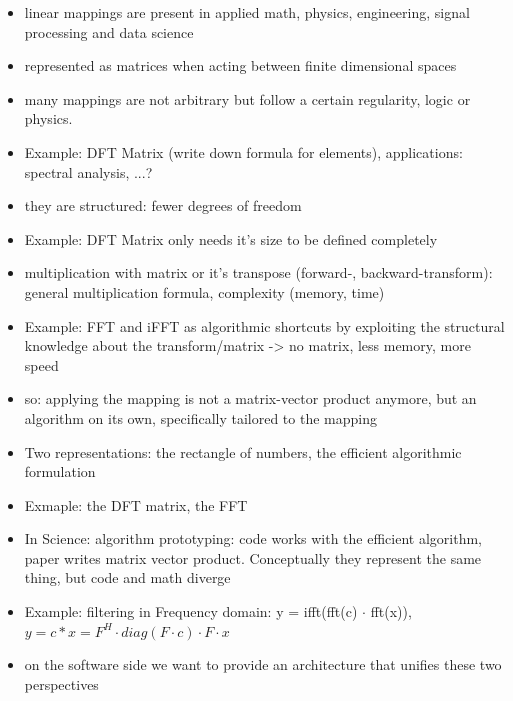 
%
%
%
%

\begin{itemize}
\item linear mappings are present in applied math, physics, engineering, signal processing and data science
\item represented as matrices when acting between finite dimensional spaces
\item many mappings are not arbitrary but follow a certain regularity, logic or physics.
\item Example: DFT Matrix (write down formula for elements), applications: spectral analysis, ...?
\item they are structured: fewer degrees of freedom
\item Example: DFT Matrix only needs it's size to be defined completely
\item multiplication with matrix or it's transpose (forward-, backward-transform): general multiplication formula, complexity (memory, time)
\item Example: FFT and iFFT as algorithmic shortcuts by exploiting the structural knowledge about the transform/matrix -> no matrix, less memory, more speed
\item so: applying the mapping is not a matrix-vector product anymore, but an algorithm on its own, specifically tailored to the mapping
\item Two representations: the rectangle of numbers, the efficient algorithmic formulation
\item Exmaple: the DFT matrix, the FFT
\item In Science: algorithm prototyping: code works with the efficient algorithm, paper writes matrix vector product. Conceptually they represent the same thing, but code and math diverge
\item Example: filtering in Frequency domain: y = ifft(fft(c) $\cdot$ fft(x)), $y = c \ast x = F^H \cdot diag(F \cdot c) \cdot F \cdot x$
\item on the software side we want to provide an architecture that unifies these two perspectives
\end{itemize}
